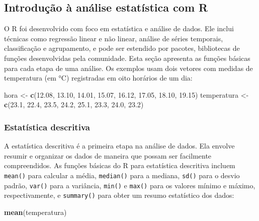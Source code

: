 \documentclass[
]{book}
\newenvironment{Shaded}{\begin{snugshade}}{\end{snugshade}}
\newcommand{\FloatTok}[1]{\textcolor[rgb]{0.00,0.00,0.81}{#1}}
\newcommand{\FunctionTok}[1]{\textcolor[rgb]{0.13,0.29,0.53}{\textbf{#1}}}
\newcommand{\NormalTok}[1]{#1}
\newcommand{\OtherTok}[1]{\textcolor[rgb]{0.56,0.35,0.01}{#1}}
\begin{document}
\subsection{Introdução à análise estatística com R}\label{introduuxe7uxe3o-uxe0-anuxe1lise-estatuxedstica-com-r}

O R foi desenvolvido com foco em estatística e análise de dados. Ele inclui técnicas como regressão linear e não linear, análise de séries temporais, classificação e agrupamento, e pode ser estendido por pacotes, bibliotecas de funções desenvolvidas pela comunidade. Esta seção apresenta as funções básicas para cada etapa de uma análise. Os exemplos usam dois vetores com medidas de temperatura (em °C) registradas em oito horários de um dia:

\begin{Shaded}
\begin{Highlighting}[]
\NormalTok{hora }\OtherTok{\textless{}{-}} \FunctionTok{c}\NormalTok{(}\FloatTok{12.08}\NormalTok{, }\FloatTok{13.10}\NormalTok{, }\FloatTok{14.01}\NormalTok{, }\FloatTok{15.07}\NormalTok{, }\FloatTok{16.12}\NormalTok{, }\FloatTok{17.05}\NormalTok{, }\FloatTok{18.10}\NormalTok{, }\FloatTok{19.15}\NormalTok{)}
\NormalTok{temperatura }\OtherTok{\textless{}{-}} \FunctionTok{c}\NormalTok{(}\FloatTok{23.1}\NormalTok{, }\FloatTok{22.4}\NormalTok{, }\FloatTok{23.5}\NormalTok{, }\FloatTok{24.2}\NormalTok{, }\FloatTok{25.1}\NormalTok{, }\FloatTok{23.3}\NormalTok{, }\FloatTok{24.0}\NormalTok{, }\FloatTok{23.2}\NormalTok{)}
\end{Highlighting}
\end{Shaded}

\subsubsection{Estatística descritiva}\label{estatuxedstica-descritiva}

A estatística descritiva é a primeira etapa na análise de dados. Ela envolve resumir e organizar os dados de maneira que possam ser facilmente compreendidos. As funções básicas do R para estatística descritiva incluem \texttt{mean()} para calcular a média, \texttt{median()} para a mediana, \texttt{sd()} para o desvio padrão, \texttt{var()} para a variância, \texttt{min()} e \texttt{max()} para os valores mínimo e máximo, respectivamente, e \texttt{summary()} para obter um resumo estatístico dos dados:

\begin{Shaded}
\begin{Highlighting}[]
\FunctionTok{mean}\NormalTok{(temperatura)}
\end{Highlighting}
\end{Shaded}
\end{document}
